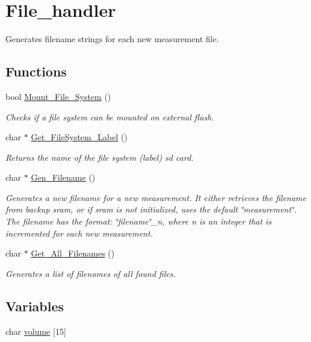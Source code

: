 \hypertarget{group__file__handler}{}\section{File\+\_\+handler}
\label{group__file__handler}


Generates filename strings for each new measurement file.  


\subsection*{Functions}
\begin{DoxyCompactItemize}
\item 
bool \hyperlink{group__file__handler_ga9efd801bbf5576d6f09ebb7281fd4d4c}{Mount\+\_\+\+File\+\_\+\+System} ()
\begin{DoxyCompactList}\small\item\em Checks if a file system can be mounted on external flash. \end{DoxyCompactList}\item 
char $\ast$ \hyperlink{group__file__handler_ga8dca3491a9ab267d90657e7d1f76c8b1}{Get\+\_\+\+File\+System\+\_\+\+Label} ()
\begin{DoxyCompactList}\small\item\em Returns the name of the file system (label) sd card. \end{DoxyCompactList}\item 
char $\ast$ \hyperlink{group__file__handler_ga891f0548fd983c0af10d8d38e45f6aaa}{Gen\+\_\+\+Filename} ()
\begin{DoxyCompactList}\small\item\em Generates a new filename for a new measurement. It either retrieves the filename from backup sram, or if sram is not initialized, uses the default \char`\"{}measurement\char`\"{}. The filename has the format\+: \char`\"{}filename\char`\"{}\+\_\+n, where n is an integer that is incremented for each new measurement. \end{DoxyCompactList}\item 
char $\ast$ \hyperlink{group__file__handler_ga3422415ffcfdb9ea67c40899bb673a05}{Get\+\_\+\+All\+\_\+\+Filenames} ()
\begin{DoxyCompactList}\small\item\em Generates a list of filenames of all found files. \end{DoxyCompactList}\end{DoxyCompactItemize}
\subsection*{Variables}
\begin{DoxyCompactItemize}
\item 
char \hyperlink{group__file__handler_ga4668281938481f362ee46f7bbf829efc}{volume} \mbox{[}15\mbox{]}
\end{DoxyCompactItemize}


